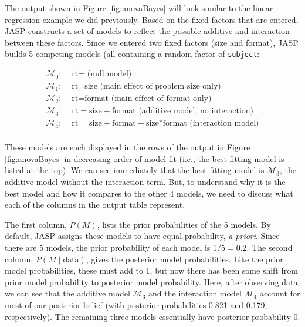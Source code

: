 \documentclass[english,,doc,floatsintext]{apa6}
\begin{document}
The output shown in Figure \ref{fig:anovaBayes} will look similar to the linear regression example we did previously. Based on the fixed factors that are entered, JASP constructs a set of models to reflect the possible additive and interaction between these factors. Since we entered two fixed factors (size and format), JASP builds 5 competing models (all containing a random factor of \texttt{subject}:

\begin{align*}
  \mathcal{M}_{0}: & \text{ rt} = \text{ (null model)}\\
  \mathcal{M}_{1}: & \text{ rt} = \text{size} \text{ (main effect of problem size only)}\\
  \mathcal{M}_{2}: & \text{ rt} = \text{format} \text{ (main effect of format only)}\\
  \mathcal{M}_{3}: & \text{ rt} = \text{size}+\text{format} \text{ (additive model, no interaction)}\\
  \mathcal{M}_{4}: & \text{ rt} = \text{size}+\text{format}+\text{size*format} \text{ (interaction model)}\\
\end{align*}

These models are each displayed in the rows of the output in Figure \ref{fig:anovaBayes} in decreasing order of model fit (i.e., the best fitting model is listed at the top). We can see immediately that the best fitting model is \(\mathcal{M}_{3}\), the additive model without the interaction term. But, to understand why it is the best model and how it compares to the other 4 models, we need to discuss what each of the columns in the output table represent.

The first column, \(P(M)\), lists the prior probabilities of the 5 models. By default, JASP assigns these models to have equal probability, \emph{a priori}. Since there are 5 models, the prior probability of each model is \(1/5 = 0.2\). The second column, \(P(M\mid \text{data})\), gives the posterior model probabilities. Like the prior model probabilities, these must add to 1, but now there has been some shift from prior model probability to posterior model probability. Here, after observing data, we can see that the additive model \(\mathcal{M}_{3}\) and the interaction model \(\mathcal{M}_{4}\) account for most of our posterior belief (with posterior probabilities 0.821 and 0.179, respectively). The remaining three models essentially have posterior probability 0.
\end{document}
